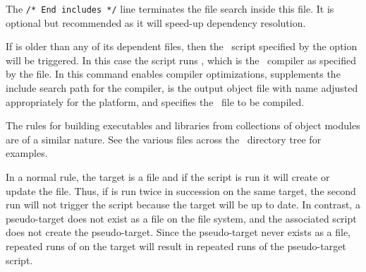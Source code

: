 The \verb+/* End includes */+ line terminates the  file search
inside this file. It is optional but recommended as it will speed-up
dependency resolution.

If  is older than any of its dependent files, then the
\Tcl\ script specified by the  option will be triggered. In
this case the script runs , which is the
\Cplusplus\ compiler as specified by the
 file. In this command
 enables compiler optimizations,  supplements the
include search path for the compiler,  is the output
object file with name adjusted appropriately for the platform, and
 specifies the \Cplusplus\ file to be compiled.

The rules for building executables and libraries from collections of
object modules are of a similar nature. See the various
 files across the \OOMMF\ directory tree for examples.

In a normal rule, the target is a file and if the script is run it will
create or update the file. Thus, if  is run twice in
succession on the same target, the second run will not trigger the
script because the target will be up to date. In contrast, a
pseudo-target does not exist as a file on
the file system, and the associated script does not create the
pseudo-target. Since the pseudo-target never exists as a file, repeated
runs of  on the target will result in repeated runs of the
pseudo-target script.

